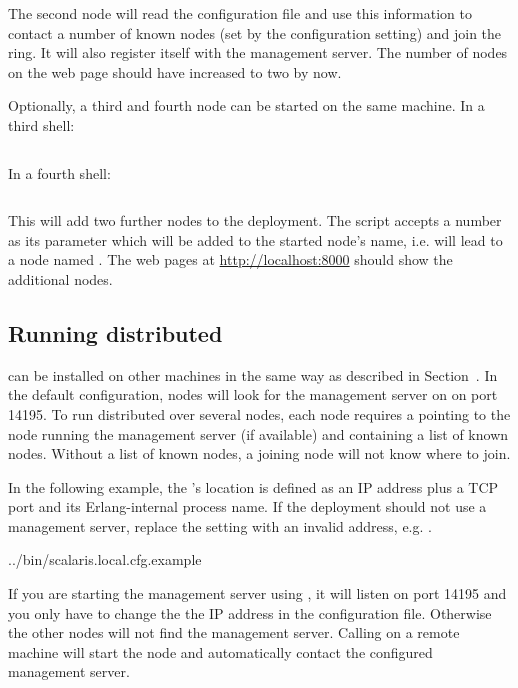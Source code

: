 The second node will read the configuration file and use this information to
contact a number of known nodes (set by the  configuration
setting) and join the ring. It will also register itself with the management
server.
The number of nodes on the web page should have increased to two by now.

Optionally, a third and fourth node can be started on the same
machine. In a third shell:
\begin{lstlisting}[language=sh]
%> ./bin/joining_node.sh 2
\end{lstlisting}

In a fourth shell:
\begin{lstlisting}[language=sh]
%> ./bin/joining_node.sh 3
\end{lstlisting}

This will add two further nodes to the deployment. The
 script accepts a number as its parameter which
will be added to the started node's name, i.e.  will lead to a node
named .
The web pages at \url{http://localhost:8000} should show the additional nodes.

\subsection{Running distributed}
\label{user.config.distributed}

\scalaris{} can be installed on other machines in the same way as
described in Section~. In the default configuration,
nodes will look for the management server on  on port 14195.
To run \scalaris{} distributed over several nodes, each node requires a
 pointing to the node running
the management server (if available) and containing a list of known nodes.
Without a list of known nodes, a joining node will not know where to join.

In the following example, the 's location is defined as
an IP address plus a TCP port and its Erlang-internal process name.
If the deployment should not use a management server, replace the setting with
an invalid address, e.g. .

            {../bin/scalaris.local.cfg.example}

If you are starting the management server using , it will
listen on port 14195 and you only have to change the the IP address in the
configuration file. Otherwise the other nodes will not find the management
server. Calling  on a remote machine will start the
node and automatically contact the configured management server.


